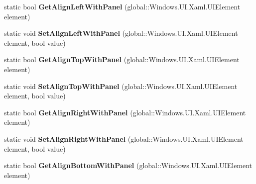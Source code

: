 \begin{DoxyCompactItemize}
static bool {\bfseries Get\+Align\+Left\+With\+Panel} (global\+::\+Windows.\+U\+I.\+Xaml.\+U\+I\+Element element)
\item 
\mbox{\label{class_windows_1_1_u_i_1_1_xaml_1_1_controls_1_1_relative_panel_acf50525353e5484990104e58477683b5}} 
static void {\bfseries Set\+Align\+Left\+With\+Panel} (global\+::\+Windows.\+U\+I.\+Xaml.\+U\+I\+Element element, bool value)
\item 
\mbox{\label{class_windows_1_1_u_i_1_1_xaml_1_1_controls_1_1_relative_panel_a79e2ec081a759fa726ebcde40fc95107}} 
static bool {\bfseries Get\+Align\+Top\+With\+Panel} (global\+::\+Windows.\+U\+I.\+Xaml.\+U\+I\+Element element)
\item 
\mbox{\label{class_windows_1_1_u_i_1_1_xaml_1_1_controls_1_1_relative_panel_a30dbaee90a5c315837eeaf26f417b320}} 
static void {\bfseries Set\+Align\+Top\+With\+Panel} (global\+::\+Windows.\+U\+I.\+Xaml.\+U\+I\+Element element, bool value)
\item 
\mbox{\label{class_windows_1_1_u_i_1_1_xaml_1_1_controls_1_1_relative_panel_ae3766e96075e9f3f5c1aec5f5d7a97cb}} 
static bool {\bfseries Get\+Align\+Right\+With\+Panel} (global\+::\+Windows.\+U\+I.\+Xaml.\+U\+I\+Element element)
\item 
\mbox{\label{class_windows_1_1_u_i_1_1_xaml_1_1_controls_1_1_relative_panel_ad7c025028b52f2ddf66289f89611fc2d}} 
static void {\bfseries Set\+Align\+Right\+With\+Panel} (global\+::\+Windows.\+U\+I.\+Xaml.\+U\+I\+Element element, bool value)
\item 
\mbox{\label{class_windows_1_1_u_i_1_1_xaml_1_1_controls_1_1_relative_panel_a5e7cb6ab9a90cb2896e3457bc67ca59b}} 
static bool {\bfseries Get\+Align\+Bottom\+With\+Panel} (global\+::\+Windows.\+U\+I.\+Xaml.\+U\+I\+Element element)
\item 
\mbox{\label{class_windows_1_1_u_i_1_1_xaml_1_1_controls_1_1_relative_panel_a52f3e04276443ca31df8ca10c97cfb60}} 

\end{DoxyCompactItemize}
